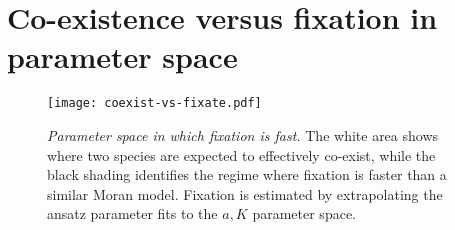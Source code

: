 


\section{Co-existence versus fixation in parameter space}
\begin{figure}[ht]
	\centering
	\texttt{[image: coexist-vs-fixate.pdf]}
	\caption{\emph{Parameter space in which fixation is fast.} The white area shows where two species are expected to effectively co-exist, while the black shading identifies the regime where fixation is faster than a similar Moran model. Fixation is estimated by extrapolating the ansatz parameter fits to the $a,K$ parameter space. }
	\label{coexistvsfixate}
\end{figure}%

